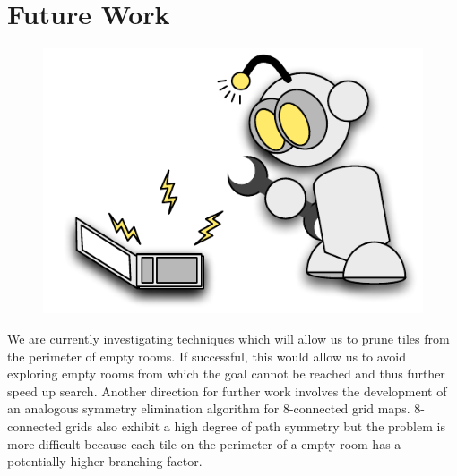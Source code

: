 \section{Future Work}
 \begin{figure}
\vspace{-4em}
		\includegraphics[width=0.28\columnwidth, trim = 10mm 10mm 10mm
10mm]{diagrams/robot_mechanic.pdf}
\vspace{1em}
 \end{figure}
We are currently investigating techniques which will allow us to prune tiles from the perimeter 
of empty rooms.
If successful, this would allow us to avoid exploring empty rooms from which the goal cannot be 
reached and thus further speed up search.
Another direction for further work involves the development of an analogous symmetry elimination 
algorithm for 8-connected grid maps.
8-connected grids also exhibit a high degree of path symmetry but the problem is more difficult
because each tile on the perimeter of a empty room has a potentially higher branching factor. 

